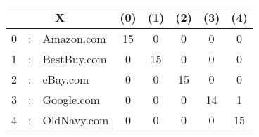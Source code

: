 \documentclass[crop]{standalone}
\begin{document}
\begin{tabular}{|lcl|c|c|c|c|c|} \hline
\multicolumn{3}{|c|}{X} & (0) & (1) & (2) & (3) & (4) \\ \hline
0 & : & Amazon.com & \cellcolor{green!100}15 & 0 & 0 & 0 & 0 \\ \hline
1 & : & BestBuy.com & 0 & \cellcolor{green!100}15 & 0 & 0 & 0 \\ \hline
2 & : & eBay.com & 0 & 0 & \cellcolor{green!100}15 & 0 & 0 \\ \hline
3 & : & Google.com & 0 & 0 & 0 & \cellcolor{green!93.33333333333333}14 & \cellcolor{red!6.666666666666667}1 \\ \hline
4 & : & OldNavy.com & 0 & 0 & 0 & 0 & \cellcolor{green!100}15 \\ \hline
\end{tabular}
\end{document}
